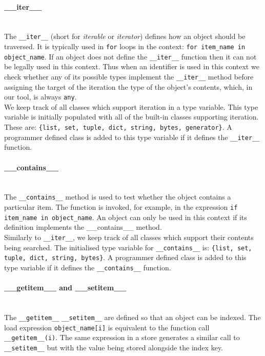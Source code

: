 \documentclass[12pt, titlepage]{article}
\begin{document}
\paragraph*{\_\_iter\_\_}\mbox{} \\
The \texttt{\_\_iter\_\_} (short for \textit{iterable} or \textit{iterator}) defines how an object should be traversed. It is typically used in \texttt{for} loops in the context: \texttt{for item\_name in object\_name}. If an object does not define the \texttt{\_\_iter\_\_} function then it can not be legally used in this context. Thus when an identifier is used in this context we check whether any of its possible types implement the \texttt{\_\_iter\_\_} method before assigning the target of the iteration the type of the object's contents, which, in our tool, is always \texttt{any}. \\
\indent We keep track of all classes which support iteration in a type variable. This type variable is initially populated with all of the built-in classes supporting iteration. These are: \texttt{\{list, set, tuple, dict, string, bytes, generator\}}. A programmer defined class is added to this type variable if it defines the \texttt{\_\_iter\_\_} function.

\paragraph*{\_\_contains\_\_}\mbox{} \\
The \texttt{\_\_contains\_\_} method is used to test whether the object contains a particular item. The function is invoked, for example, in the expression \texttt{if item\_name in object\_name}. An object can only be used in this context if its definition implements the \_\_contains\_\_ method. \\
\indent Similarly to \texttt{\_\_iter\_\_}, we keep track of all classes which support their contents being searched. The initialised type variable for \texttt{\_\_contains\_\_} is: \texttt{\{list, set, tuple, dict, string, bytes\}}. A programmer defined class is added to this type variable if it defines the \texttt{\_\_contains\_\_} function.

\paragraph*{\_\_getitem\_\_ and \_\_setitem\_\_}\mbox{} \\
The \texttt{\_\_getitem\_\_} \texttt{\_\_setitem\_\_} are defined so that an object can be indexed. The load expression \texttt{object\_name[i]} is equivalent to the function call \texttt{\_\_getitem\_\_(i)}. The same expression in a store generates a similar call to \texttt{\_\_setitem\_\_} but with the value being stored alongside the index key.
\end{document}
